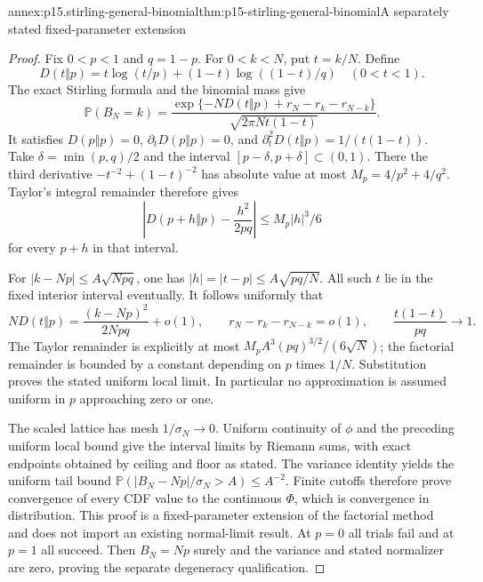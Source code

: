 \begin{annexitem}{annex:p15.stirling-general-binomial}{thm:p15-stirling-general-binomial}{A separately stated fixed-parameter extension}
\begin{proof}
Fix \(0<p<1\) and \(q=1-p\). For \(0<k<N\), put \(t=k/N\).
Define
\[
 D(t\Vert p)=t\log(t/p)+(1-t)\log((1-t)/q)
                                      \quad(0<t<1).
\]
The exact Stirling formula and the binomial mass give
\[
 \mathbb P(B_N=k)
 =\frac{\exp\{-ND(t\Vert p)+r_N-r_k-r_{N-k}\}}
              {\sqrt{2\pi N t(1-t)}}.
\]
It satisfies \(D(p\Vert p)=0\),
\(\partial_tD(p\Vert p)=0\), and
\(\partial_t^2D(t\Vert p)=1/(t(1-t))\).
Take \(\delta=\min(p,q)/2\) and the interval
\([p-\delta,p+\delta]\subset(0,1)\).
There the third derivative
\(-t^{-2}+(1-t)^{-2}\) has absolute value at most
\(M_p=4/p^2+4/q^2\).
Taylor's integral remainder therefore gives
\[
 \left|D(p+h\Vert p)-\frac{h^2}{2pq}\right|
                           \leq M_p|h|^3/6
\]
for every \(p+h\) in that interval.

For \(|k-Np|\leq A\sqrt{Npq}\), one has
\(|h|=|t-p|\leq A\sqrt{pq/N}\).
All such \(t\) lie in the fixed interior interval
eventually. It follows uniformly that
\[
 ND(t\Vert p)=\frac{(k-Np)^2}{2Npq}+o(1),\qquad
 r_N-r_k-r_{N-k}=o(1),\qquad
 \frac{t(1-t)}{pq}\to1.
\]
The Taylor remainder is explicitly at most
\(M_pA^3(pq)^{3/2}/(6\sqrt N)\);
the factorial remainder is bounded by a constant
depending on \(p\) times \(1/N\).
Substitution proves the stated uniform local limit.
In particular no approximation is assumed uniform in
\(p\) approaching zero or one.

The scaled lattice has mesh \(1/\sigma_N\to0\).
Uniform continuity of \(\phi\) and the preceding uniform
local bound give the interval limits by Riemann sums,
with exact endpoints obtained by ceiling and floor as
stated. The variance identity yields the uniform tail
bound
\(\mathbb P(|B_N-Np|/\sigma_N>A)\leq A^{-2}\).
Finite cutoffs therefore prove convergence of every CDF
value to the continuous \(\Phi\), which is convergence
in distribution. This proof is a fixed-parameter
extension of the factorial method and does not import
an existing normal-limit result.
At \(p=0\) all trials fail and at \(p=1\) all succeed.
Then \(B_N=Np\) surely and the variance and stated
normalizer are zero, proving the separate degeneracy
qualification.
\end{proof}
\end{annexitem}

